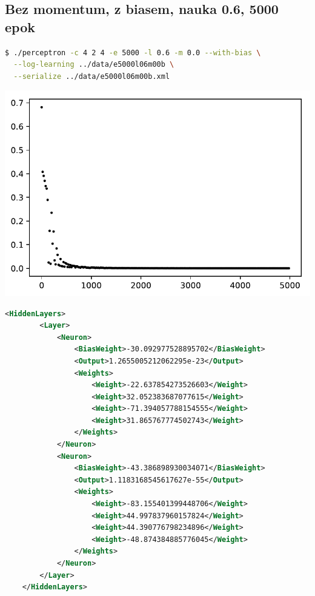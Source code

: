 \documentclass{classrep}
\begin{document}
\subsection{Bez momentum, z biasem, nauka 0.6, 5000 epok}
\begin{lstlisting}[language=bash]
$ ./perceptron -c 4 2 4 -e 5000 -l 0.6 -m 0.0 --with-bias \
  --log-learning ../data/e5000l06m00b \
  --serialize ../data/e5000l06m00b.xml
\end{lstlisting}
\begin{center}
 \includegraphics{sprawozdanie/output_0_13.pdf}
\end{center}
\begin{lstlisting}[language=xml]
    <HiddenLayers>
        <Layer>
            <Neuron>
                <BiasWeight>-30.092977528895702</BiasWeight>
                <Output>1.2655005212062295e-23</Output>
                <Weights>
                    <Weight>-22.637854273526603</Weight>
                    <Weight>32.052383687077615</Weight>
                    <Weight>-71.394057788154555</Weight>
                    <Weight>31.865767774502743</Weight>
                </Weights>
            </Neuron>
            <Neuron>
                <BiasWeight>-43.386898930034071</BiasWeight>
                <Output>1.1183168545617627e-55</Output>
                <Weights>
                    <Weight>-83.155401399448706</Weight>
                    <Weight>44.997837960157824</Weight>
                    <Weight>44.390776798234896</Weight>
                    <Weight>-48.874384885776045</Weight>
                </Weights>
            </Neuron>
        </Layer>
    </HiddenLayers>
\end{lstlisting}
\clearpage
\end{document}

